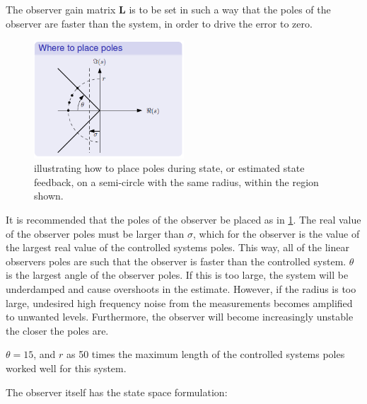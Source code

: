 The observer gain matrix $\bm{L}$ is to be set in such a way that the
poles of the observer are faster than the system, in order to drive the
error to zero.
\begin{figure}[H]
  \caption{ illustrating how to place poles during state, or estimated
    state feedback, on a semi-circle with the same radius, within the
    region shown.}
  \label{fig:pole_placement}
  \begin{center}
    \includegraphics[width=0.5\textwidth]{images/pole_placement}
  \end{center}
\end{figure}
 It is recommended that the
poles of the observer be placed as in
\cref{fig:pole_placement}. The real value of the observer poles must be larger
than $\sigma$, which for the observer is the value of the largest real
value of the controlled systems poles. This way, all of the linear
observers poles are such that the observer is faster than the controlled system. $\theta$ is the
largest angle of the observer poles. If this is too large, the system will be underdamped and cause
overshoots in the estimate. However, if the radius is too large, undesired high
frequency noise from the measurements becomes amplified to unwanted
levels. Furthermore, the observer will become increasingly unstable the closer the poles are.

$\theta = 15$, and $r$ as 50 times the maximum length of the
controlled systems poles worked well for this system.

The observer itself has the state space formulation:

